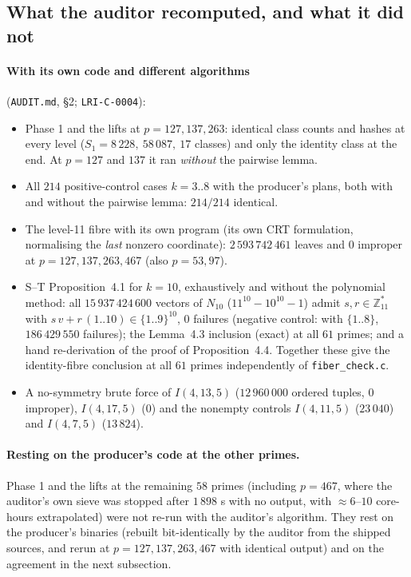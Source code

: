 \documentclass[10pt]{article}
\newcommand{\Z}{\mathbb{Z}}
\begin{document}
\subsection{What the auditor recomputed, and what it did not}
\paragraph{With its own code and different algorithms} (\texttt{AUDIT.md}, \S2; \texttt{LRI-C-0004}):
\begin{itemize}\itemsep=0pt
\item Phase 1 and the lifts at $p=127,137,263$: identical class counts and hashes at every level ($S_1=8\,228,\ 58\,087,\ 17$ classes) and only the identity class at the end. At $p=127$ and $137$ it ran \emph{without} the pairwise lemma.
\item All $214$ positive-control cases $k=3..8$ with the producer's plans, both with and without the pairwise lemma: $214/214$ identical.
\item The level-11 fibre with its own program (its own CRT formulation, normalising the \emph{last} nonzero coordinate): $2\,593\,742\,461$ leaves and $0$ improper at $p=127,137,263,467$ (also $p=53,97$).
\item S--T Proposition~4.1 for $k=10$, exhaustively and without the polynomial method: all $15\,937\,424\,600$ vectors of $N_{10}$ ($11^{10}-10^{10}-1$) admit $s,r\in\Z_{11}^*$ with $s\,v+r\,(1..10)\in\{1..9\}^{10}$, $0$ failures (negative control: with $\{1..8\}$, $186\,429\,550$ failures); the Lemma~4.3 inclusion (exact) at all $61$ primes; and a hand re-derivation of the proof of Proposition~4.4. Together these give the identity-fibre conclusion at all $61$ primes independently of \texttt{fiber\_check.c}.
\item A no-symmetry brute force of $I(4,13,5)$ ($12\,960\,000$ ordered tuples, $0$ improper), $I(4,17,5)$ ($0$) and the nonempty controls $I(4,11,5)$ ($23\,040$) and $I(4,7,5)$ ($13\,824$).
\end{itemize}
\paragraph{Resting on the producer's code at the other primes.} Phase 1 and the lifts at the remaining $58$ primes (including $p=467$, where the auditor's own sieve was stopped after $1\,898$ s with no output, with $\approx6$--$10$ core-hours extrapolated) were not re-run with the auditor's algorithm. They rest on the producer's binaries (rebuilt bit-identically by the auditor from the shipped sources, and rerun at $p=127,137,263,467$ with identical output) and on the agreement in the next subsection.
\end{document}
